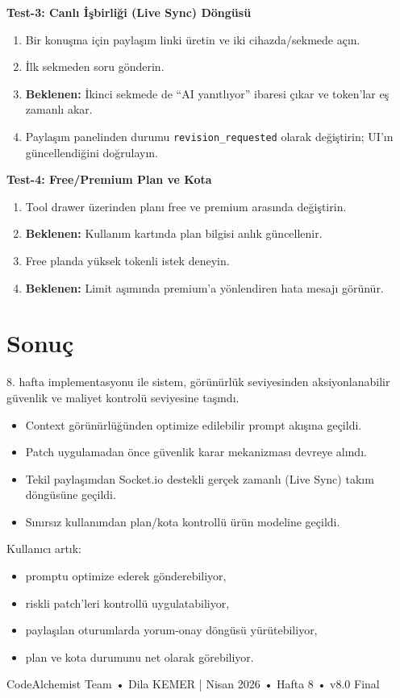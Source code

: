 \documentclass[11pt,a4paper]{article}
\begin{document}
\textbf{Test-3: Canlı İşbirliği (Live Sync) Döngüsü}
\begin{enumerate}[leftmargin=1.5em]
  \item Bir konuşma için paylaşım linki üretin ve iki cihazda/sekmede açın.
  \item İlk sekmeden soru gönderin.
  \item \textbf{Beklenen:} İkinci sekmede de ``AI yanıtlıyor'' ibaresi çıkar ve token'lar eş zamanlı akar.
  \item Paylaşım panelinden durumu \texttt{revision\_requested} olarak değiştirin; UI'ın güncellendiğini doğrulayın.
\end{enumerate}

\textbf{Test-4: Free/Premium Plan ve Kota}
\begin{enumerate}[leftmargin=1.5em]
  \item Tool drawer üzerinden planı free ve premium arasında değiştirin.
  \item \textbf{Beklenen:} Kullanım kartında plan bilgisi anlık güncellenir.
  \item Free planda yüksek tokenli istek deneyin.
  \item \textbf{Beklenen:} Limit aşımında premium'a yönlendiren hata mesajı görünür.
\end{enumerate}

\section{Sonuç}

8. hafta implementasyonu ile sistem, görünürlük seviyesinden aksiyonlanabilir güvenlik ve maliyet kontrolü seviyesine taşındı.

\begin{notebox}
\begin{itemize}[leftmargin=1.2em,nosep]
  \item Context görünürlüğünden optimize edilebilir prompt akışına geçildi.
  \item Patch uygulamadan önce güvenlik karar mekanizması devreye alındı.
  \item Tekil paylaşımdan Socket.io destekli gerçek zamanlı (Live Sync) takım döngüsüne geçildi.
  \item Sınırsız kullanımdan plan/kota kontrollü ürün modeline geçildi.
\end{itemize}
\end{notebox}

Kullanıcı artık:
\begin{itemize}[leftmargin=1.5em]
  \item promptu optimize ederek gönderebiliyor,
  \item riskli patch'leri kontrollü uygulatabiliyor,
  \item paylaşılan oturumlarda yorum-onay döngüsü yürütebiliyor,
  \item plan ve kota durumunu net olarak görebiliyor.
\end{itemize}

\vfill
\begin{center}
\small CodeAlchemist Team • Dila KEMER \quad| Nisan 2026 • Hafta 8 • v8.0 Final
\end{center}
\end{document}
